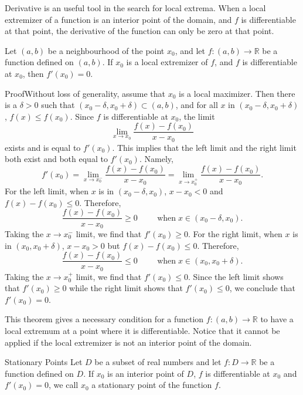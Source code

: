 Derivative is an useful tool in the search for local extrema. 
When a local extremizer of a function is an interior point of the domain, and $f$ is differentiable at that point, the derivative of the function can only be zero at that point.
\begin{theorem}[label=thm230215_2]{}
Let $(a, b)$ be a neighbourhood of the point $x_0$, and let $f:(a,b)\to\mathbb{R}$ be a function defined on $(a,b)$. If $x_0$ is a local extremizer of $f$, and $f$ is differentiable at $x_0$, then $f'(x_0)=0$.
\end{theorem}
\begin{myproof}{Proof}Without loss of generality, assume that $x_0$ is a local maximizer. Then there is a $\delta>0$ such that $(x_0-\delta, x_0+\delta)\subset (a,b)$, and for all $x$ in $(x_0-\delta, x_0+\delta)$, $f(x)\leq f(x_0)$. 
Since $f$ is differentiable at $x_0$, the limit
\[\lim_{x\to x_0}\frac{f(x)-f(x_0)}{x-x_0}\] exists and is equal to $f'(x_0)$. This implies that the left limit and the right limit both exist and both equal to $f'(x_0)$.
Namely,
\[f'(x_0)=\lim_{x\to x_0^-}\frac{f(x)-f(x_0)}{x-x_0}=\lim_{x\to x_0^+}\frac{f(x)-f(x_0)}{x-x_0}.\]\bp
For the left limit, when $x$ is in $(x_0-\delta, x_0)$, $x-x_0<0$ and $f(x)-f(x_0)\leq 0$. Therefore,
\[\frac{f(x)-f(x_0)}{x-x_0}\geq 0\hspace{1cm}\text{when}\;x\in (x_0-\delta, x_0).\]
Taking the $x\to x_0^-$ limit, we find that $f'(x_0)\geq 0$. For the right limit, when $x$ is in $(x_0, x_0+\delta)$, $x-x_0>0$ but $f(x)-f(x_0)\leq 0$.  Therefore,
\[\frac{f(x)-f(x_0)}{x-x_0}\leq 0\hspace{1cm}\text{when}\;x\in (x_0, x_0+\delta).\]
Taking the $x\to x_0^+$ limit, we find that $f'(x_0)\leq 0$. Since the left limit shows that $f'(x_0)\geq 0$ while the right limit shows that $f'(x_0)\leq 0$,  we conclude that $f'(x_0)=0$.
\end{myproof}
This theorem gives a necessary condition for a function $f:(a,b)\rightarrow\mathbb{R}$ to have a local extremum at a point where it is differentiable. Notice that it cannot be applied if the local extremizer is not an interior point of the domain. 

\begin{definition}{Stationary Points}
Let $D$ be a subset of real numbers and let $f:D\to\mathbb{R}$ be a function defined on $D$. If $x_0$ is an interior point of $D$,   $f$ is differentiable at $x_0$ and $f'(x_0)=0$, we call $x_0$ a stationary point of the function $f$. 
\end{definition}

